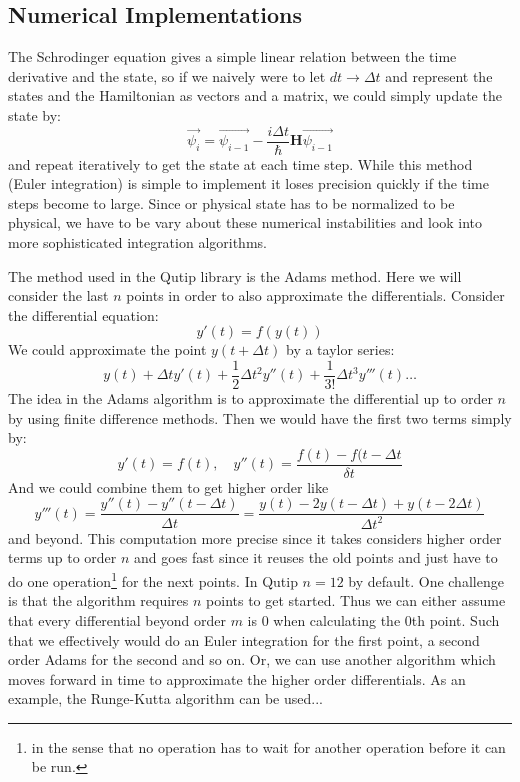 \subsection{Numerical Implementations}\label{sec:numerical_implementations}
The Schrodinger equation gives a simple linear relation between the time derivative and the state, so if we naively were to let $dt\to\Delta t$ and represent the states and the Hamiltonian as vectors and a matrix, we could simply update the state by:
\begin{equation}
    \Vec{\psi_i} =  \Vec{\psi_{i-1}} - \frac{i\Delta t}{\hbar}\boldsymbol{H} \Vec{\psi_{i - 1}}
\end{equation}
and repeat iteratively to get the state at each time step. While this method (Euler integration) is simple to implement it loses precision quickly if the time steps become to large. Since or physical state has to be normalized to be physical, we have to be vary about these numerical instabilities and look into more sophisticated integration algorithms.

The method used in the Qutip library is the Adams method. Here we will consider the last $n$ points in order to also approximate the differentials. Consider the differential equation:
\begin{equation}
    y'(t) = f(y(t))
\end{equation}
We could approximate the point $y(t+\Delta t)$ by a taylor series:
\begin{equation}
    y(t) + \Delta t y'(t) + \frac12 \Delta t^2 y''(t) + \frac{1}{3!} \Delta t^3 y'''(t)\dots 
\end{equation}
The idea in the Adams algorithm is to approximate the differential up to order $n$ by using finite difference methods. Then we would have the first two terms simply by:
\begin{equation}
    y'(t) = f(t), \quad y''(t) = \frac{f(t) - f(t - \Delta t}{\delta t} 
\end{equation}
And we could combine them to get higher order like
\begin{equation}
    y'''(t) = \frac{y''(t) - y''(t-\Delta t)}{\Delta t} = \frac{y(t) - 2y(t-\Delta t) + y(t-2\Delta t)}{\Delta t^2}
\end{equation}
and beyond. This computation more precise since it takes considers higher order terms up to order $n$ and goes fast since it reuses the old points and just have to do one operation\footnote{in the sense that no operation has to wait for another operation before it can be run.} for the next points. In Qutip $n=12$ by default. One challenge is that the algorithm requires $n$ points to get started. Thus we can either assume that every differential beyond order $m$ is $0$ when calculating the $0$th point. Such that we effectively would do an Euler integration for the first point, a second order Adams for the second and so on. Or, we can use another algorithm which moves forward in time to approximate the higher order differentials. As an example, the Runge-Kutta algorithm can be used...

